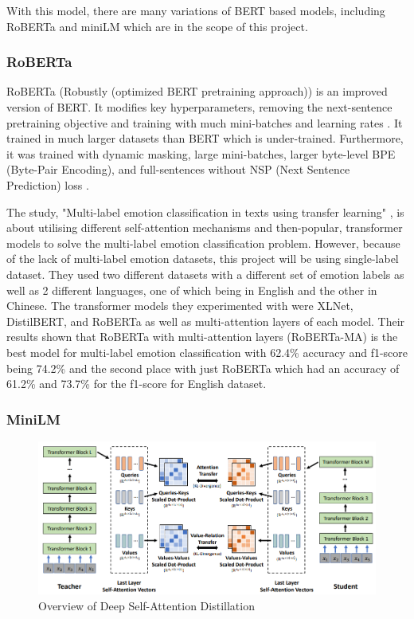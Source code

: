 With this model, there are many variations of BERT based models, including RoBERTa and miniLM which are in the scope of this project. 

\subsubsection{RoBERTa}
RoBERTa (Robustly (optimized BERT pretraining approach)) is an improved version of BERT.
It modifies key hyperparameters, removing the next-sentence pretraining objective and training with much mini-batches and learning rates \cite{Sharma_2022}.
It trained in much larger datasets than BERT which is under-trained. 
Furthermore, it was trained with dynamic masking, large mini-batches, larger byte-level BPE (Byte-Pair Encoding), and full-sentences without NSP (Next Sentence Prediction) loss \cite{Sharma_2022}.

The study, "Multi-label emotion classification in texts using transfer learning" \cite{AMEER2023118534}, is about utilising different self-attention mechanisms and then-popular, transformer models to solve the multi-label emotion classification problem.
However, because of the lack of multi-label emotion datasets, this project will be using single-label dataset.
They used two different datasets with a different set of emotion labels as well as 2 different languages, one of which being in English and the other in Chinese.
The transformer models they experimented with were XLNet, DistilBERT, and RoBERTa as well as multi-attention layers of each model.
Their results shown that RoBERTa with multi-attention layers (RoBERTa-MA) is the best model for multi-label emotion classification with 62.4\% accuracy and f1-score being 74.2\% and the second place with just RoBERTa which had an accuracy of 61.2\% and 73.7\% for the f1-score for English dataset. 

\subsubsection{MiniLM}

\begin{figure}[ht]
    \centerline{\includegraphics[scale=.5]{Figures/deep_self-distillation.png}}
    \caption{Overview of Deep Self-Attention Distillation}
    \label{fig:distillation}
 \end{figure}

